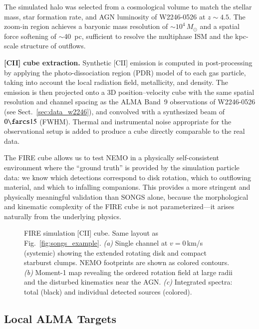 \documentclass{aa}
\begin{document}
The simulated halo was selected from a cosmological volume to match the stellar mass, star formation rate, and AGN luminosity of W2246-0526 at $z \sim 4.5$. The zoom-in region achieves a baryonic mass resolution of $\sim$$10^4\,M_\odot$ and a spatial force softening of $\sim$40~pc, sufficient to resolve the multiphase ISM and the kpc-scale structure of outflows.

\textbf{[CII] cube extraction.} Synthetic [CII] emission is computed in post-processing by applying the photo-dissociation region (PDR) model of \citet{...} to each gas particle, taking into account the local radiation field, metallicity, and density. The emission is then projected onto a 3D position--velocity cube with the same spatial resolution and channel spacing as the ALMA Band~9 observations of W2246-0526 (see Sect.~\ref{sec:data_w2246}), and convolved with a synthesized beam of $0\farcs15$ (FWHM). Thermal and instrumental noise appropriate for the observational setup is added to produce a cube directly comparable to the real data.

The FIRE cube allows us to test NEMO in a physically self-consistent environment where the ``ground truth'' is provided by the simulation particle data: we know which detections correspond to disk rotation, which to outflowing material, and which to infalling companions. This provides a more stringent and physically meaningful validation than SONGS alone, because the morphological and kinematic complexity of the FIRE cube is not parameterized---it arises naturally from the underlying physics.

\begin{figure}
  \centering
  \caption{FIRE simulation [CII] cube. Same layout as Fig.~\ref{fig:songs_example}. \textit{(a)} Single channel at $v = 0$\,km/s (systemic) showing the extended rotating disk and compact starburst clumps. NEMO footprints are shown as colored contours. \textit{(b)} Moment-1 map revealing the ordered rotation field at large radii and the disturbed kinematics near the AGN. \textit{(c)} Integrated spectra: total (black) and individual detected sources (colored).}
  \label{fig:fire_example}
\end{figure}

\subsection{Local ALMA Targets}
\label{sec:data_local}
\end{document}
